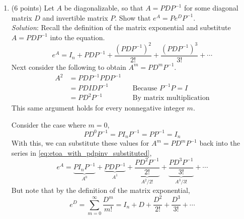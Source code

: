 \documentclass{article}
\newcommand{\reason}[1]{&& \text{#1}}
\begin{document}
\begin{enumerate}
        Furthermore, the expression inside the parentheses is the Maclaurin series for $e^x$ evaluated at $x=1$. That is,
        \[
          \sum_{m=0}^{\infty}\frac{1^m}{m!} = e
        \]
        This implies,
        \begin{align*}
          e^{I_n} & = \left(\sum_{m=0}^{\infty}\frac{1^m}{m!}\right)I_n \\[1ex]
                  & = eI_n
        \end{align*}

        Therefore
        \[
          \boxed{e^{I_n} = eI_n}
        \]

  \item (6 points) Let $A$ be diagonalizable, so that $A = PDP^{-1}$ for some diagonal matrix $D$ and invertible matrix $P$. Show that $e^A = Pe^{D}P^{-1}$.\\
        \emph{Solution}: Recall the definition of the matrix exponential and substitute $A=PDP^{-1}$ into the equation.
        \begin{equation}
          e^A
          =I_n+PDP^{-1}+\frac{(PDP^{-1})^2}{2!}+\frac{(PDP^{-1})^3}{3!}+\cdots \label{eq:etoa_with_pdpinv_substituted}
        \end{equation}
        Next consider the following to obtain $A^m=PD^mP^{-1}$.
        \begin{align*}
          A^2 & = PDP^{-1}PDP^{-1}                             \\
              & = PDIDP^{-1} \reason{Because $P^{-1}P=I$}      \\
              & = PD^2P^{-1} \reason{By matrix multiplication}
        \end{align*}
        This same argument holds for every nonnegative integer $m$.

        Consider the case where $m=0$,
        \[
          PD^0P^{-1} = PI_nP^{-1} = PP^{-1} = I_n
        \]
        With this, we can substitute these values for $A^m=PD^mP^{-1}$ back into the series in \eqref{eq:etoa_with_pdpinv_substituted},
        \begin{equation}
          e^A = \underbrace{PI_nP^{-1}}_{A^0} +
          \underbrace{PDP^{-1}}_{A^1} +
          \underbrace{\frac{PD^2P^{-1}}{2!}}_{A^2/2!} +
          \underbrace{\frac{PD^3P^{-1}}{3!}}_{A^3/3!} +
          \cdots \label{eq:expanded_e_to_A}
        \end{equation}
        But note that by the definition of the matrix exponential,
        \begin{equation}
          e^D=\sum_{m=0}^{\infty}\frac{D^m}{m!}
          = I_n + D + \frac{D^2}{2!} + \frac{D^3}{3!} + \cdots \label{eq:e_to_D}
        \end{equation}


\end{enumerate}
\end{document}
